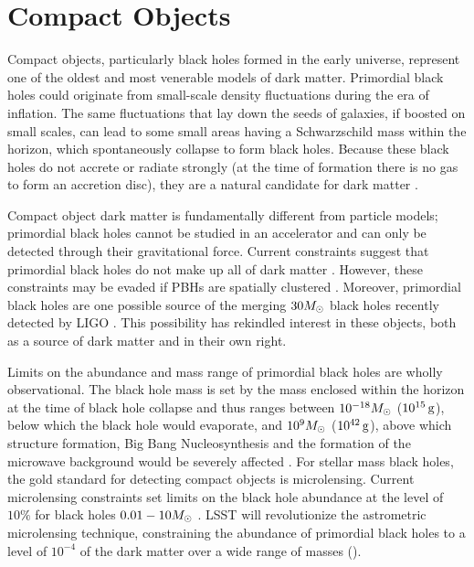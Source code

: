 \section{Compact Objects }
\label{sec:machos}

Compact objects, particularly black holes formed in the early universe, represent one of the oldest and most venerable models of dark matter. Primordial black holes could originate from small-scale density fluctuations during the era of inflation. The same fluctuations that lay down the seeds of galaxies, if boosted on small scales, can lead to some small areas having a Schwarzschild mass within the horizon, which spontaneously collapse to form black holes. Because these black holes do not accrete or radiate strongly (at the time of formation there is no gas to form an accretion disc), they are a natural candidate for dark matter \citep{Carr:1974nx,Meszaros:1974,1975Natur.253..251C,Bellido:1996,Carr:2016drx}. 

Compact object dark matter is fundamentally different from particle models; primordial black holes cannot be studied in an accelerator and can only be detected through their gravitational force. Current constraints suggest that primordial black holes do not make up all of dark matter \citep[\eg][]{Sasaki:2018}. However, these constraints may be evaded if PBHs are spatially clustered \citep{Clesse:2015,Clesse:2017}. Moreover, primordial black holes are one possible source of the merging $30 M_\odot$ black holes recently detected by LIGO \citep{Bird:2016,Clesse:2016}. This possibility has rekindled interest in these objects, both as a source of dark matter and in their own right.

Limits on the abundance and mass range of primordial black holes are wholly observational. The black hole mass is set by the mass enclosed within the horizon at the time of black hole collapse and thus ranges between $10^{-18} M_\odot$ ($10^{15}\mathrm{\,g}$), below which the black hole would evaporate, and $10^9 M_\odot$ ($10^{42}\mathrm{\,g}$), above which structure formation, Big Bang Nucleosynthesis and the formation of the microwave background would be severely affected \citep{Sasaki:2018}. 
For stellar mass black holes, the gold standard for detecting compact objects is microlensing. Current microlensing constraints set limits on the black hole abundance at the level of $10\%$ for black holes $0.01 - 10 M_\odot$ \citep[however, see][]{2018MNRAS.479.2889C}. LSST will revolutionize the astrometric microlensing technique,  constraining the abundance of primordial black holes to a level of $10^{-4}$ of the dark matter over a wide range of masses ().

